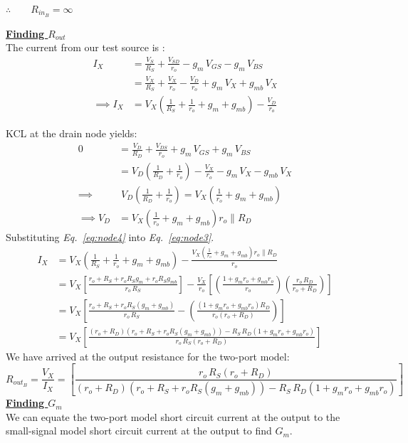 \documentclass[12pt, fleqn]{article}
\begin{document}
\begin{enumerate}[label=(\alph*)]
{    $\therefore\qquad\boxed{R_{{in}_B} = \infty}$
    \vspace{0.5cm}
    
    \underline{\textbf{Finding $R_{out}$}}\\[0.25cm]
    The current from our test source is :
    \begin{align}
        I_X &= \frac{V_S}{R_S} + \frac{V_{SD}}{r_o} - g_m\,V_{GS} - g_m\,V_{BS}\\[0.25cm]
        &= \frac{V_X}{R_S} + \frac{V_X}{r_o} - \frac{V_D}{r_o} + g_m\,V_X + g_{mb}\,V_X\\[0.25cm]
        \implies I_X &= V_X\left(\frac{1}{R_S} + \frac{1}{r_o} + g_m + g_{mb}\right) - \frac{V_D}{r_o}
        \label{eq:node3}
    \end{align}
    
    KCL at the drain node yields:
    \begin{align}
        0 &= \frac{V_D}{R_D} + \frac{V_{DS}}{r_o} + g_m\,V_{GS} + g_m\,V_{BS}\\[0.25cm]
        &= V_D\left(\frac{1}{R_D} + \frac{1}{r_o}\right) - \frac{V_X}{r_o} - g_m\,V_X - g_{mb}\,V_X\\[0.25cm]
        \implies &\;V_D\left(\frac{1}{R_D} + \frac{1}{r_o}\right) = V_X\left(\frac{1}{r_o} + g_m + g_{mb}\right)\\[0.25cm]
        \implies V_D &= V_X\left(\frac{1}{r_o} + g_m + g_{mb}\right)r_o \parallel R_D
        \label{eq:node4}
    \end{align}
    Substituting \textit{Eq.~\ref{eq:node4}} into \textit{Eq.~\ref{eq:node3}}.
    \begin{align*}
        I_X &= V_X\left(\frac{1}{R_S} + \frac{1}{r_o} + g_m + g_{mb}\right) - \frac{V_X\left(\frac{1}{r_o} + g_m + g_{mb}\right)r_o \parallel R_D}{r_o}\\[0.25cm]
        &= V_X\left[\frac{r_o + R_S + r_o R_S g_m + r_o R_S  g_{mb}}{r_o\,R_S}\right]
            - \frac{V_X}{r_o}\left[\left(\frac{1 + g_m r_o + g_{mb} r_o}{r_o}\right)\left(\frac{r_o\,R_D}{r_o + R_D}\right)\right]\\[0.25cm]
        &= V_X\left[\frac{r_o + R_S + r_o R_S(g_m + g_{mb})}{r_o\,R_S} - \left(\frac{(1 + g_m r_o + g_{mb} r_o)R_D}{r_o(r_o + R_D)}\right)\right]\\[0.25cm]
        &= V_X\left[\frac{(r_o + R_D)(r_o + R_S + r_o R_S(g_m + g_{mb})) - R_S\,R_D(1 + g_m r_o + g_{mb} r_o)}{r_o\,R_S(r_o + R_D)}\right]
    \end{align*}
    We have arrived at the output resistance for the two-port model:
    \begin{equation}
        \boxed{R_{{out}_B} = \frac{V_X}{I_X} = \left[\frac{r_o\,R_S(r_o + R_D)}{(r_o + R_D)(r_o + R_S + r_o R_S(g_m + g_{mb})) - R_S\,R_D(1 + g_m r_o + g_{mb} r_o)}\right]}
    \end{equation}
    \underline{\textbf{Finding $G_m$}}\\[0.25cm]
    We can equate the two-port model short circuit current at the output to the small-signal model short circuit current at the output to find $G_m$.
    
}
\end{enumerate}
\end{document}
